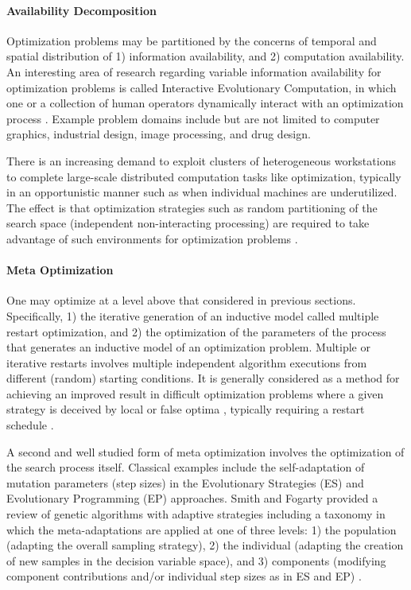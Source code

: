 \paragraph{Availability Decomposition}
Optimization problems may be partitioned by the concerns of temporal and spatial distribution of 1) information availability, and 2) computation availability. An interesting area of research regarding variable information availability for optimization problems is called Interactive Evolutionary Computation, in which one or a collection of human operators dynamically interact with an optimization process \cite{Takagi2001}. Example problem domains include but are not limited to computer graphics, industrial design, image processing, and drug design. 

There is an increasing demand to exploit clusters of heterogeneous workstations to complete large-scale distributed computation tasks like optimization, typically in an opportunistic manner such as when individual machines are underutilized. The effect is that optimization strategies such as random partitioning of the search space (independent non-interacting processing) are required to take advantage of such environments for optimization problems \cite{Schnekenburger1993, Liu2000}.
	
\paragraph{Meta Optimization}
One may optimize at a level above that considered in previous sections. Specifically, 1) the iterative generation of an inductive model called multiple restart optimization, and 2) the optimization of the parameters of the process that generates an inductive model of an optimization problem. Multiple or iterative restarts involves multiple independent algorithm executions from different (random) starting conditions. It is generally considered as a method for achieving an improved result in difficult optimization problems where a given strategy is deceived by local or false optima \cite{Muselli1997, Hu1994}, typically requiring a restart schedule \cite{Fukunaga1998}. 

A second and well studied form of meta optimization involves the optimization of the search process itself. Classical examples include the self-adaptation of mutation parameters (step sizes) in the Evolutionary Strategies (ES) and Evolutionary Programming (EP) approaches. Smith and Fogarty provided a review of genetic algorithms with adaptive strategies including a taxonomy in which the meta-adaptations are applied at one of three levels: 1) the population (adapting the overall sampling strategy), 2) the individual (adapting the creation of new samples in the decision variable space), and 3) components (modifying component contributions and/or individual step sizes as in ES and EP) \cite{Smith1997b}.



